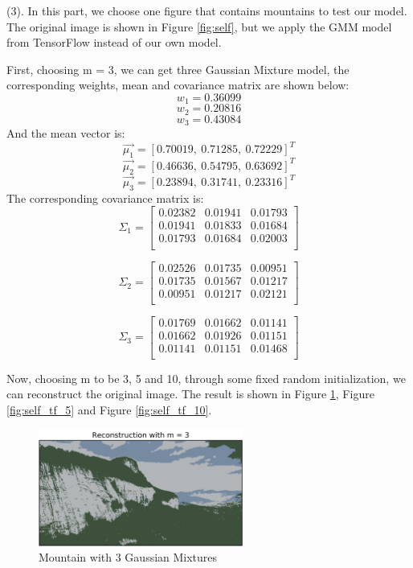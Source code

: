 (3). In this part, we choose one figure that contains mountains to test our model. The original image is shown in Figure \ref{fig:self}, but we apply the GMM model from TensorFlow instead of our own model.

First, choosing m = 3, we can get three Gaussian Mixture model, the corresponding weights, mean and covariance matrix are shown below:
$$ w_1 = 0.36099 $$
$$ w_2 = 0.20816 $$
$$ w_3 = 0.43084 $$
And the mean vector is:
$$ \vec{\mu_1} = [0.70019, \  0.71285, \  0.72229]^T$$
$$ \vec{\mu_2} = [0.46636, \  0.54795, \  0.63692]^T$$
$$ \vec{\mu_3} = [0.23894, \  0.31741, \  0.23316]^T$$
The corresponding covariance matrix is:
$$\Sigma_1 =
\begin{bmatrix}
	0.02382 &	0.01941 &	0.01793 \\
  	0.01941 &	0.01833 &	0.01684 \\
  	0.01793 &	0.01684 &	0.02003 \\
\end{bmatrix}$$

$$\Sigma_2 =
\begin{bmatrix}
	0.02526 &	0.01735  &	0.00951 \\
  	0.01735 &	0.01567  &	0.01217 \\
  	0.00951 &	0.01217  &	0.02121 \\
\end{bmatrix}$$

$$\Sigma_3 =
\begin{bmatrix}
	0.01769 &	0.01662 &	0.01141 \\
  	0.01662 &	0.01926 &	0.01151 \\
  	0.01141 &	0.01151 &	0.01468 \\
\end{bmatrix}$$

Now, choosing m to be 3, 5 and 10, through some fixed random initialization, we can reconstruct the original image. The result is shown in Figure \ref{fig:self_tf_3}, Figure \ref{fig:self_tf_5} and Figure \ref{fig:self_tf_10}.

\begin{figure}[H]
\centering
\includegraphics[width=0.6\textwidth]{./figures/self_tf_3.png}
\caption{\label{fig:self_tf_3} Mountain with 3 Gaussian Mixtures}
\end{figure}

